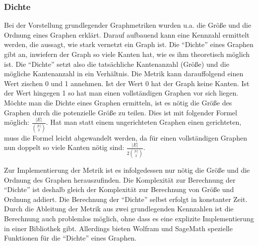 \documentclass[a4paper,12pt,ngerman,chapterprefix=false,listof=totoc,bibliography=totoc]{scrreprt}
\begin{document}
\subsubsection*{Dichte}
{
Bei der Vorstellung grundlegender Graphmetriken wurden u.a. die Größe und die Ordnung eines Graphen erklärt. Darauf aufbauend kann eine Kennzahl ermittelt werden, die aussagt, wie stark vernetzt ein Graph ist. Die "`Dichte"' eines Graphen gibt an, inwiefern der Graph so viele Kanten hat, wie es ihm theoretisch möglich ist. Die "`Dichte"' setzt also die tatsächliche Kantenanzahl (Größe) und die mögliche Kantenanzahl in ein Verhältnis. Die Metrik kann darauffolgend einen Wert zischen 0 und 1 annehmen. Ist der Wert 0 hat der Graph keine Kanten. Ist der Wert hingegen 1 so hat man einen vollständigen Graphen vor sich liegen. Möchte man die Dichte eines Graphen ermitteln, ist es nötig die Größe des Graphen durch die potenzielle Größe zu teilen. Dies ist mit folgender Formel möglich: \(\frac{\vert E\vert}{\binom{\vert V\vert}{2}}\). Hat man statt einem ungerichteten Graphen einen gerichteten, muss die Formel leicht abgewandelt werden, da für einen vollständigen Graphen nun doppelt so viele Kanten nötig sind: \(\frac{\vert E\vert}{2\binom{\vert V\vert}{2}}\). \cite{diestel_graphentheorie_2000}

Zur Implementierung der Metrik ist es infolgedessen nur nötig die Größe und die Ordnung des Graphen herauszufinden. Die Komplexität zur Berechnung der "`Dichte"' ist deshalb gleich der Komplexität zur Berechnung von Größe und Ordnung addiert. Die Berechnung der "`Dichte"' selbst erfolgt in konstanter Zeit. Durch die Ableitung der Metrik aus zwei grundlegenden Kennzahlen ist die Berechnung auch problemlos möglich, ohne dass es eine explizite Implementierung in einer Bibliothek gibt. Allerdings bieten Wolfram und SageMath spezielle Funktionen für die "`Dichte"' eines Graphen. \cite{sagemath_graph_2020,wolfram_wolfram_2020,matlab_directed_2020}
}
\end{document}
